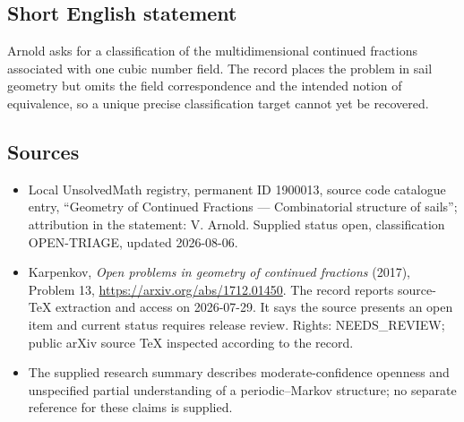 \documentclass[11pt]{article}
\begin{document}
\subsection{Short English statement}
Arnold asks for a classification of the multidimensional continued fractions associated with one cubic number field. The record places the problem in sail geometry but omits the field correspondence and the intended notion of equivalence, so a unique precise classification target cannot yet be recovered.
\subsection{Sources}
\begin{itemize}
\item Local UnsolvedMath registry, permanent ID 1900013, source code catalogue entry, ``Geometry of Continued Fractions --- Combinatorial structure of sails''; attribution in the statement: V. Arnold. Supplied status open, classification OPEN-TRIAGE, updated 2026-08-06.
\item Karpenkov, \emph{Open problems in geometry of continued fractions} (2017), Problem 13, \url{https://arxiv.org/abs/1712.01450}. The record reports source-TeX extraction and access on 2026-07-29. It says the source presents an open item and current status requires release review. Rights: NEEDS\_REVIEW; public arXiv source TeX inspected according to the record.
\item The supplied research summary describes moderate-confidence openness and unspecified partial understanding of a periodic--Markov structure; no separate reference for these claims is supplied.
\end{itemize}
\end{document}

